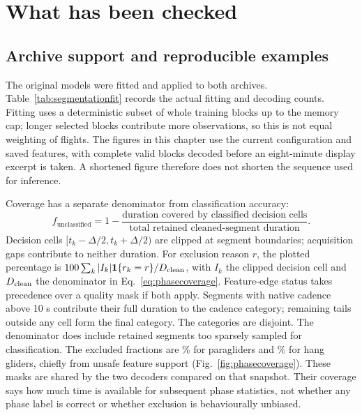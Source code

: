 \section{What has been checked}
\label{sec:phasevalidation}
\subsection{Archive support and reproducible examples}
The original models were fitted and applied to both archives.
Table~\ref{tab:segmentationfit} records the actual fitting and decoding counts. Fitting
uses a deterministic subset of whole training blocks up to the memory cap; longer selected
blocks contribute more observations, so this is not equal weighting of flights.
\SegAuditArchiveStatus
The figures in this chapter use the current configuration and saved features,
with complete valid blocks decoded before an eight-minute display excerpt is taken.
A shortened figure therefore does not shorten the sequence used for inference.




\SegAuditFitStatus

Coverage has a separate denominator from classification accuracy:
\begin{equation}
 f_{\mathrm{unclassified}}
 =1-\frac{\text{duration covered by classified decision cells}}
              {\text{total retained cleaned-segment duration}}.
 \label{eq:phasecoverage}
\end{equation}
Decision cells $[t_k-\Delta/2,t_k+\Delta/2)$ are clipped at segment boundaries;
acquisition gaps contribute to neither duration. For exclusion reason $r$, the plotted
percentage is $100\sum_k |I_k|\mathbf1\{r_k=r\}/D_{\rm clean}$, with $I_k$ the clipped
decision cell and $D_{\rm clean}$ the denominator in Eq.~\eqref{eq:phasecoverage}.
Feature-edge status takes precedence over a quality mask if both apply. Segments with
native cadence above 10 s contribute their full duration to the cadence category;
remaining tails outside any cell form the final category. The categories are disjoint. The denominator does include retained
segments too sparsely sampled for classification. The excluded fractions are \SegAuditParaExcludedPct\%
for paragliders and \SegAuditHangExcludedPct\% for hang gliders, chiefly from unsafe feature support
(Fig.~\ref{fig:phasecoverage}). These masks are shared by the two decoders compared on that snapshot.
\SegAuditSupportStatus Their coverage says how much time is available for subsequent phase statistics,
not whether any phase label is correct or whether exclusion is behaviourally unbiased.


